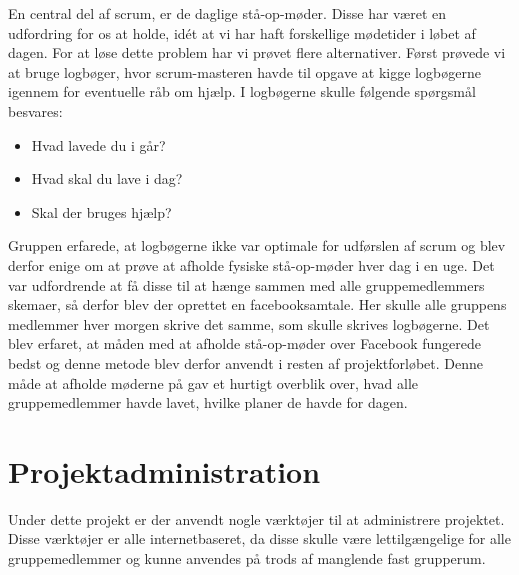 En central del af scrum, er de daglige stå-op-møder. Disse har været en udfordring for os at holde, idét at vi har haft forskellige mødetider i løbet af dagen. For at løse dette problem har vi prøvet flere alternativer. Først prøvede vi at bruge logbøger, hvor scrum-masteren havde til opgave at kigge logbøgerne igennem for eventuelle råb om hjælp. I logbøgerne skulle følgende spørgsmål besvares:

\begin{itemize}
	\item Hvad lavede du i går?
	\item Hvad skal du lave i dag?
	\item Skal der bruges hjælp?
\end{itemize} 


Gruppen erfarede, at logbøgerne ikke var optimale for udførslen af scrum og blev derfor enige om at prøve at afholde fysiske stå-op-møder hver dag i en uge. Det var udfordrende at få disse til at hænge sammen med alle gruppemedlemmers skemaer, så derfor blev der oprettet en facebooksamtale. Her skulle alle gruppens medlemmer hver morgen skrive det samme, som skulle skrives logbøgerne. Det blev erfaret, at måden med at afholde stå-op-møder over Facebook fungerede bedst og denne metode blev derfor anvendt i resten af projektforløbet. Denne måde at afholde møderne på gav et hurtigt overblik over, hvad alle gruppemedlemmer havde lavet, hvilke planer de havde for dagen. 

\section{Projektadministration}
Under dette projekt er der anvendt nogle værktøjer til at administrere projektet. Disse værktøjer er alle internetbaseret, da disse skulle være lettilgængelige for alle gruppemedlemmer og kunne anvendes på trods af manglende fast grupperum.

